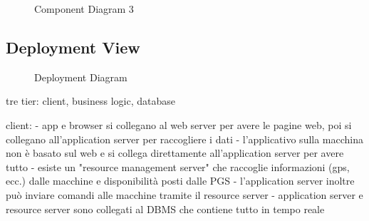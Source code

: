 \documentclass[english]{article}
\begin{document}
\begin{figure}[H]
	\centering
	\caption{Component Diagram 3}
	\label{componentdiagram3}
\end{figure}

\newpage
\subsection{Deployment View}

\begin{figure}[H]
	\centering
	\caption{Deployment Diagram}
	\label{deploymentdiagram}
\end{figure}

tre tier: client, business logic, database

client:
- app e browser si collegano al web server per avere le pagine web, poi si collegano all'application server per raccogliere i dati
- l'applicativo sulla macchina non è basato sul web e si collega direttamente all'application server per avere tutto
- esiste un "resource management server" che raccoglie informazioni (gps, ecc.) dalle macchine e disponibilità posti dalle PGS
- l'application server inoltre può inviare comandi alle macchine tramite il resource server
- application server e resource server sono collegati al DBMS che contiene tutto in tempo reale
\end{document}
